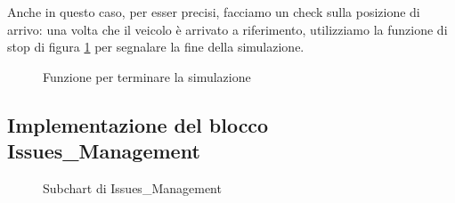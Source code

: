 \documentclass{article}
\begin{document}
            Anche in questo caso, per esser precisi, facciamo un check sulla posizione di arrivo: una volta che il veicolo è arrivato a riferimento, utilizziamo la funzione 
            di stop di figura \ref{fig:stop}
            per segnalare la fine della simulazione.

            \begin{figure} [ht]
                \caption{Funzione per terminare la simulazione}
                \label{fig:stop}
            \end{figure}

            \newpage
            
        \subsection{Implementazione del blocco Issues\_Management}

            \begin{figure} [ht]
                \caption{Subchart di Issues\_Management}
                \label{fig:issman}
            \end{figure}
\end{document}
